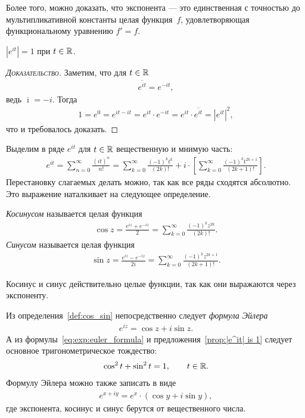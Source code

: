 \documentclass[../complex-analysis.tex]{subfiles}
\begin{document}
Более того, можно доказать, что экспонента --- это единственная с точностью до мультипликативной константы целая функция~$ f $, удовлетворяющая функциональному уравнению $ f' = f $.

\begin{prop}
 \label{prop:|e^it| is 1}
 $ \left| e^{it} \right| = 1 $ при $ t \in \mathbb{R} $.
\end{prop}
\begin{proof}[\normalfont\textsc{Доказательство}]
 Заметим, что для $ t \in \mathbb{R} $
 \begin{align*}
  \overline{e^{it}} = e^{-it},
 \end{align*} ведь $ \overline \imath = -i $. Тогда
 \begin{align*}
  1 = e^{0} = e^{it - it} = e^{it} \cdot e^{-it} = e^{it} \cdot \overline{e^{it}} = \left| e^{it} \right|^{2},
 \end{align*} что и требовалось доказать.
\end{proof}

Выделим в ряде $ e^{it} $ для $ t \in \mathbb{R} $ вещественную и мнимую часть:
\begin{align*}
 e^{it} = \sum_{n=0}^{\infty} \frac{(it)^{n}}{n!} = \sum_{k=0}^{\infty} \frac{(-1)^{k}t^{k}}{(2k)!} + i \cdot \left[ \sum_{k=0}^{\infty} \frac{(-1)^{k}t^{2k+1}}{(2k+1)!} \right].
\end{align*} Перестановку слагаемых делать можно, так как все ряды сходятся абсолютно. Это выражение наталкивает на следующее определение.

\begin{df}
 \label{def:cos_sin}
 \emph{Косинусом} называется целая функция
 \begin{align*}
  \cos z = \frac{e^{iz} + e^{-iz}}{2} = \sum_{k=0}^{\infty} \frac{(-1)^{k}z^{2k}}{(2k)!}.
 \end{align*} \emph{Синусом} называется целая функция
 \begin{align*}
  \sin z = \frac{e^{iz} - e^{-iz}}{2i} = \sum_{k=0}^{\infty} \frac{(-1)^{k}z^{2k+1}}{(2k+1)!}.
 \end{align*}
\end{df}
\begin{remrk*}
 Косинус и синус действительно целые функции, так как они выражаются через экспоненту.
\end{remrk*}

Из определения~\ref{def:cos_sin} непосредственно следует \emph{формула Эйлера}
\begin{align}
 \label{eq:exp:euler_formula}
 e^{iz} = \cos z + i \sin z.
\end{align} А из формулы~\eqref{eq:exp:euler_formula} и предложения~\ref{prop:|e^it| is 1} следует основное тригонометрическое тождество:
\begin{align*}
 \cos^{2}t+\sin^{2}t=1,\qquad t\in\mathbb{R}.
\end{align*} Формулу Эйлера можно также записать в виде
\begin{align*}
 e^{x+iy} = e^{x} \cdot (\cos y + i \sin y),
\end{align*} где экспонента, косинус и синус берутся от вещественного числа.
\end{document}

